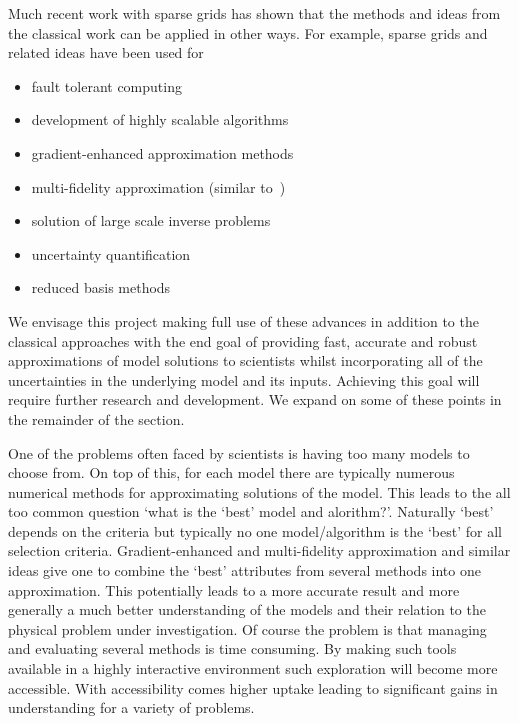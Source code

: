 \documentclass[a4paper,fontsize=12pt]{scrartcl}
\begin{document}
Much recent work with sparse grids has shown that the methods and ideas
from the classical work can be applied in other ways.
For example, sparse grids and related ideas have been used for
\begin{itemize}
\item fault tolerant computing~\cite{HardingHLS2015,AliEtal2015}
\item development of highly scalable algorithms~\cite{StrazdinsEtal2015}
\item gradient-enhanced approximation methods~\cite{deBaarHarding2015}
\item multi-fidelity approximation (similar to~\cite{deBaarRDM2015}) 
\item solution of large scale inverse problems~\cite{Zabaras2010}
\item uncertainty quantification~\cite{JakemanRoberts2013}
\item reduced basis methods~\cite{ChenSchwab2015}
\end{itemize}
We envisage this project making full use of these advances in addition 
to the classical approaches with the end goal of providing fast, accurate
and robust approximations of model solutions to scientists whilst 
incorporating all of the uncertainties in the underlying model and its inputs. 
Achieving this goal will require further research and development.
We expand on some of these points in the remainder of the section.

One of the problems often faced by scientists is having too many models 
to choose from. On top of this, for each model there are typically numerous
numerical methods for approximating solutions of the model.
This leads to the all too common question `what is the `best' model and alorithm?'.
Naturally `best' depends on the criteria but typically no one model/algorithm is
the `best' for all selection criteria.
Gradient-enhanced and multi-fidelity approximation and similar ideas give one
to combine the `best' attributes from several methods into one approximation.
This potentially leads to a more accurate result and more generally a much better
understanding of the models and their relation to the physical problem under investigation.
Of course the problem is that managing and evaluating several methods is time
consuming. By making such tools available in a highly interactive environment
such exploration will become more accessible. With accessibility comes higher 
uptake leading to significant gains in understanding for a variety of problems.
\end{document}
